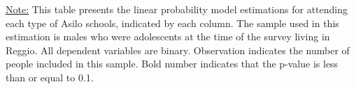 \begin{footnotesize}
\noindent\underline{Note:} This table presents the linear probability model estimations for attending each type of Asilo schools, indicated by each column. The sample used in this estimation is males who were adolescents at the time of the survey living in Reggio. All dependent variables are binary. Observation indicates the number of people included in this sample. Bold number indicates that the p-value is less than or equal to 0.1.
\end{footnotesize}
